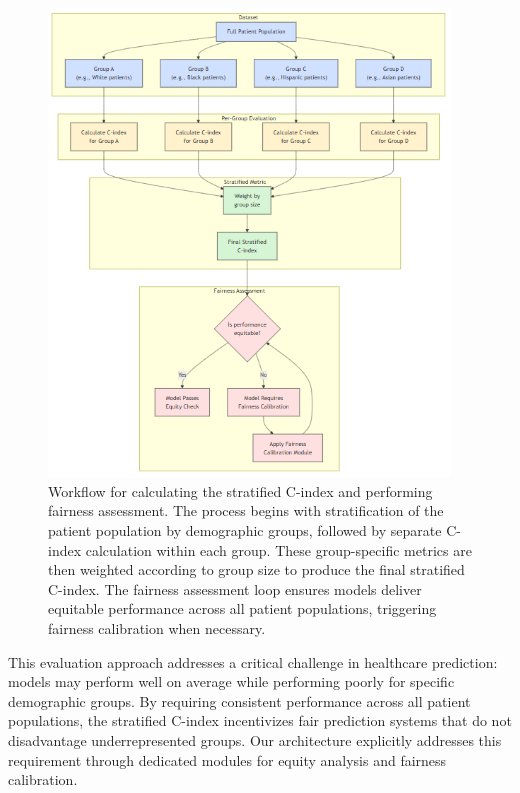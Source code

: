 \begin{figure}[H]
    \centering
    \includegraphics[width=0.95\textwidth]{figures/StratifiedCindexDiagram.png}
    \caption{Workflow for calculating the stratified C-index and performing fairness assessment. The process begins with stratification of the patient population by demographic groups, followed by separate C-index calculation within each group. These group-specific metrics are then weighted according to group size to produce the final stratified C-index. The fairness assessment loop ensures models deliver equitable performance across all patient populations, triggering fairness calibration when necessary.}
    \label{fig:cindex_fairness_diagram}
\end{figure}

This evaluation approach addresses a critical challenge in healthcare prediction: models may perform well on average while performing poorly for specific demographic groups. By requiring consistent performance across all patient populations, the stratified C-index incentivizes fair prediction systems that do not disadvantage underrepresented groups. Our architecture explicitly addresses this requirement through dedicated modules for equity analysis and fairness calibration.

